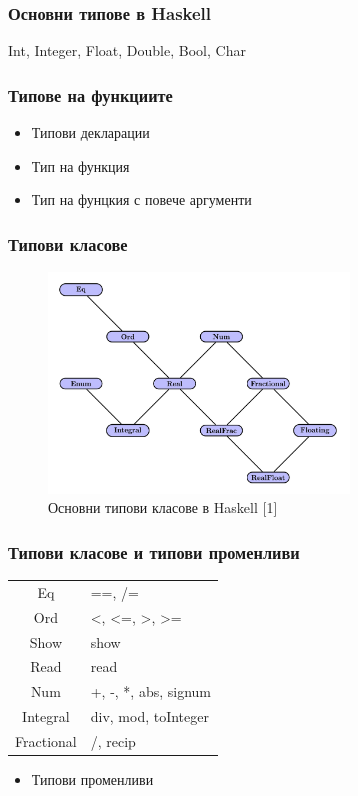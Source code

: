 \documentclass{beamer}
\begin{document}
\begin{frame}[fragile]
  \frametitle{Основни типове в Haskell}

  Int, Integer, Float, Double, Bool, Char

\end{frame}


\begin{frame}[fragile]
  \frametitle{Типове на функциите}

  \begin{itemize}
    \item Типови декларации
    \item Тип на функция
    \item Тип на фунцкия с повече аргументи
  \end{itemize}

\end{frame}


\begin{frame}[fragile]
  \frametitle{Типови класове}

  \begin{figure}
    \includegraphics[width=8cm]{images/type-inclusion.png}
    \caption{Основни типови класове в Haskell [1]}
  \end{figure}

\end{frame}

\begin{frame}[fragile]
  \frametitle{Типови класове и типови променливи}

  \begin{tabular}{c|l}
    Eq & ==, /= \\
    Ord & <, <=, >, >= \\
    Show & show \\
    Read & read \\
    Num & +, -, *, abs, signum \\
    Integral & div, mod, toInteger \\
    Fractional & /, recip    
  \end{tabular}

  \bigskip

  \begin{itemize}
    \item Типови променливи
  \end{itemize}

\end{frame}
\end{document}
